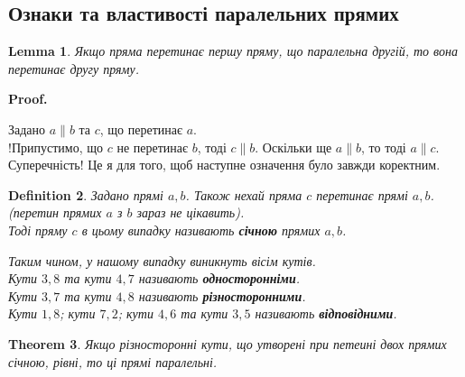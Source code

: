 \documentclass[a4paper, 10pt]{article}
\makeatletter
\theoremstyle{theoremdd}
\newtheorem{theorem}{Theorem}[subsection]
\theoremstyle{theoremdd}
\theoremstyle{theoremdd}
\newtheorem{definition}[theorem]{Definition}
\theoremstyle{theoremdd}
\theoremstyle{theoremdd}
\theoremstyle{theoremdd}
\theoremstyle{theoremdd}
\theoremstyle{theoremdd}
\newtheorem{lemma}[theorem]{Lemma}
\theoremstyle{theoremdd}
\renewenvironment{proof}[1][Proof.\\]{\par
\pushQED{\hfill \qed}%
\normalfont \topsep6\p@\@plus6\p@\relax
\trivlist
\item\relax
{\bfseries
#1\@addpunct{.}}\hspace\labelsep\ignorespaces
}{%
\popQED\endtrivlist\@endpefalse
}
\makeatother
\begin{document}
\subsection{Ознаки та властивості паралельних прямих}
\begin{lemma}
Якщо пряма перетинає першу пряму, що паралельна другій, то вона перетинає другу пряму.
\end{lemma}

\begin{proof}
Задано $a \parallel b$ та $c$, що перетинає $a$.\\
!Припустимо, що $c$ не перетинає $b$, тоді $c \parallel b$. Оскільки ще $a \parallel b$, то тоді $a \parallel c$. Суперечність!
\end{proof}
Це я для того, щоб наступне означення було завжди коректним.

\begin{definition}
Задано прямі $a,b$. Також нехай пряма $c$ перетинає прямі $a,b$. (перетин прямих $a$ з $b$ зараз не цікавить).\\
Тоді пряму $c$ в цьому випадку називають \textbf{січною} прямих $a,b$.
\begin{figure}[H]
\centering
{}
\end{figure}
Таким чином, у нашому випадку виникнуть вісім кутів.\\
Кути $3,8$ та кути $4,7$ називають \textbf{односторонніми}.\\
Кути $3,7$ та кути $4,8$ називають \textbf{різносторонними}.\\
Кути $1,8$; кути $7,2$; кути $4,6$ та кути $3,5$ називають \textbf{відповідними}.
\end{definition}

\begin{theorem}
Якщо різносторонні кути, що утворені при петеині двох прямих січною, рівні, то ці прямі паралельні.
\end{theorem}
\end{document}

